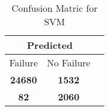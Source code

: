 \begin{table}[] 
\caption{Confusion Matric for SVM} 
\label{Table: Prediction Accuracy-NoneSVM70.0EKF-ignoreReflection-Reflection} 
\centering 
\begin{tabular} 
 {@{}ccc@{}} 
\toprule 
\multicolumn{2}{c}{\textbf{Predicted}}
 \\ \midrule 
\multicolumn{1}{|c|}{Failure} & 
\multicolumn{1}{c|}{No Failure}
 \\ \midrule 
\multicolumn{1}{|c|}{\color{green}\textbf{24680}} & 
\multicolumn{1}{c|}{\color{red}\textbf{1532}}
 \\ \midrule 
\multicolumn{1}{|c|}{\color{red}\textbf{82}} & 
\multicolumn{1}{c|}{\color{green}\textbf{2060}}
 \\ \bottomrule 
\end{tabular} 
\end{table} 
